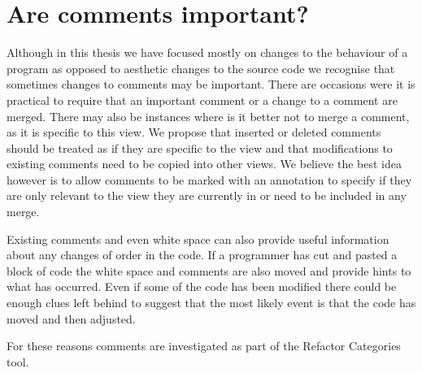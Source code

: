 \section{Are comments important?}
Although in this thesis we have focused mostly on changes to the behaviour of a program as opposed to aesthetic changes to the source code we recognise that sometimes changes to comments may be important.  There are occasions were it is practical to require that an important comment or a change to a comment are merged.  There may also be instances where is it better not to merge a comment, as it is specific to this view.  We propose that inserted or deleted comments should be treated as if they are specific to the view and that modifications to existing comments need to be copied into other views.  We believe the best idea however is to allow comments to be marked with an annotation to specify if they are only relevant to the view they are currently in or need to be included in any merge. 

Existing comments and even white space can also provide useful information about any changes of order in the code.  If a programmer has cut and pasted a block of code the white space and comments are also moved and provide hints to what has occurred.  Even if some of the code has been modified there could be enough clues left behind to suggest that the most likely event is that the code has moved and then adjusted.

For these reasons comments are investigated as part of the Refactor Categories tool.

